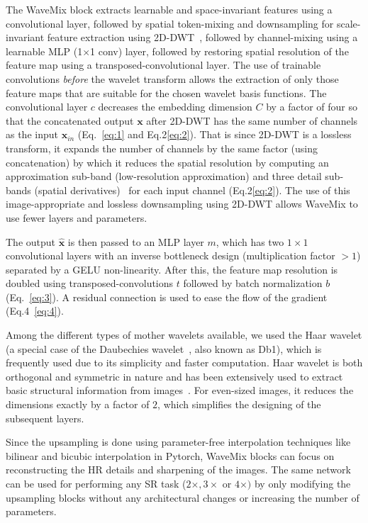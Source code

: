 \documentclass{article}
\begin{document}
The WaveMix block extracts learnable and space-invariant features using a convolutional layer, followed by spatial token-mixing and downsampling for scale-invariant feature extraction using 2D-DWT~\cite{pyTorchWavelets}, followed by channel-mixing using a learnable MLP (1$\times$1 conv) layer, followed by restoring spatial resolution of the feature map using a transposed-convolutional layer. The use of trainable convolutions \emph{before} the wavelet transform allows the extraction of only those feature maps that are suitable for the chosen wavelet basis functions. The convolutional layer $c$ decreases the embedding dimension  $C$ by a factor of four so that the concatenated output $\textbf{x}$ after 2D-DWT has the same number of channels as the input $\textbf{x}_{in}$ (Eq.~\ref{eq:1} and Eq.2\ref{eq:2}). That is since 2D-DWT is a lossless transform, it expands the number of channels by the same factor (using concatenation) by which it reduces the spatial resolution by computing an approximation sub-band (low-resolution approximation) and three detail sub-bands (spatial derivatives)~\cite{57199} for each input channel (Eq.2\ref{eq:2}). The use of this image-appropriate and lossless downsampling using 2D-DWT allows WaveMix to use fewer layers and parameters.

The output $\hat{\textbf{x}}$ is then passed to an MLP layer $m$, which has two $1\times1$ convolutional layers with an inverse bottleneck design (multiplication factor $> 1$) separated by a GELU non-linearity. After this, the feature map resolution is doubled using transposed-convolutions $t$ followed by batch normalization $b$ (Eq.~\ref{eq:3}). A residual connection is used to ease the flow of the gradient~\cite{he2015deep} (Eq.4~\ref{eq:4}). 


Among the different types of mother wavelets available, we used the Haar wavelet (a special case of the Daubechies wavelet~\cite{57199}, also known as Db1), which is frequently used due to its simplicity and faster computation. Haar wavelet is both orthogonal and symmetric in nature and has been extensively used to extract basic structural information from images~\cite{Porwik2004TheHT}. For even-sized images, it reduces the dimensions exactly by a factor of $2$, which simplifies the designing of the subsequent layers.

Since the upsampling is done using parameter-free interpolation techniques like bilinear and bicubic interpolation in Pytorch, WaveMix blocks can focus on reconstructing the HR details and sharpening of the images. The same network can be used for performing any SR task ($2\times, 3\times $ or $ 4\times)$ by only modifying the upsampling blocks without any architectural changes or increasing the number of parameters.
\end{document}
